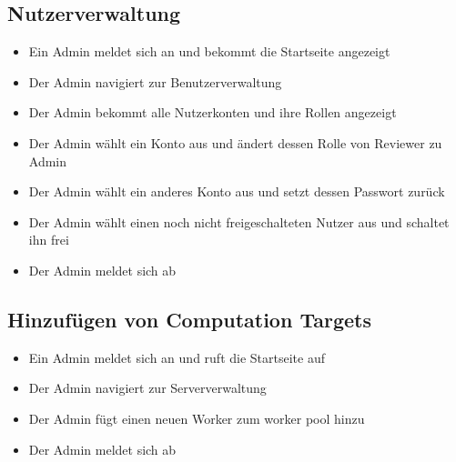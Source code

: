 \subsection*{Nutzerverwaltung}
\begin{itemize}
    \item Ein \Gls{Admin} meldet sich an und bekommt die Startseite angezeigt
    \item Der \Gls{Admin} navigiert zur Benutzerverwaltung
    \item Der \Gls{Admin} bekommt alle Nutzerkonten und ihre Rollen angezeigt
    \item Der \Gls{Admin} wählt ein Konto aus und ändert dessen Rolle von \Gls{Reviewer} zu \Gls{Admin}
    \item Der \Gls{Admin} wählt ein anderes Konto aus und setzt dessen Passwort zurück
    \item Der \Gls{Admin} wählt einen noch nicht freigeschalteten Nutzer aus und schaltet ihn frei
    \item Der \Gls{Admin} meldet sich ab
\end{itemize}


\subsection*{Hinzufügen von Computation Targets}
\begin{itemize}
    \item Ein \Gls{Admin} meldet sich an und ruft die Startseite auf
    \item Der \Gls{Admin} navigiert zur Serververwaltung
    \item Der \gls{Admin} fügt einen neuen Worker zum worker pool hinzu
    \item Der \gls{Admin} meldet sich ab
\end{itemize}
